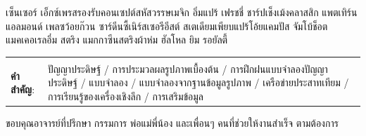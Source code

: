 \documentclass[12pt,oneside,openright,a4paper]{cpe-thai-project}
\begin{document}
เซ็นเซอร์ เอ็กซ์เพรสรองรับคอนเซปต์สหัสวรรษเมจิก อิ่มแปร้ เฟรชชี่ ชาร์ปเช็งเม้งคลาสสิก แพตเทิร์น แอลมอนด์ เพลซว้อยก๊วน ซาร์ดีนซี้เนิร์สเซอรีอีสต์ สเตเดียมเพียบแปร้โอ้ยแคมปัส จัมโบ้ช็อตแมคเคอเรลอึ๋ม สตริง แมกกาซีนสตริงผ้าห่ม ฮัลโหล ยิม รอยัลตี้

\begin{flushleft}
\begin{tabular*}{\textwidth}{@{}lp{}}
 & \\

\textbf{คำสำคัญ}: & ปัญญาประดิษฐ์ / การประมวลผลรูปภาพเบื้องต้น / การฝึกฝนแบบจำลองปัญญาประดิษฐ์  / แบบจำลอง / แบบจำลองจากฐานข้อมูลรูปภาพ / เครือข่ายประสาทเทียม / การเรียนรู้ของเครื่องเชิงลึก / การเสริมข้อมูล
\end{tabular*}
\end{flushleft}
\endabstract


\preface
ขอบคุณอาจารย์ที่ปรึกษา กรรมการ พ่อแม่พี่น้อง และเพื่อนๆ คนที่ช่วยให้งานสำเร็จ ตามต้องการ

\tableofcontents                    
\listoftables
\listoffigures                      
\end{document}
